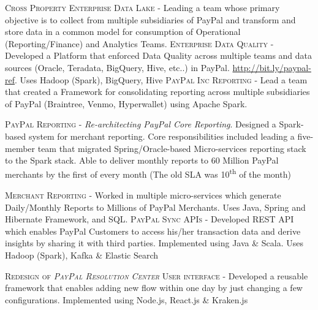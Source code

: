 \documentclass[11pt, a4paper, sans]{moderncv}
\begin{document}
{\textsc{Cross Property Enterprise Data Lake} - Leading a team whose primary objective is to collect from multiple subsidiaries of PayPal and transform and store data in a common model for consumption of Operational (Reporting/Finance) and Analytics Teams. \newline
\newline \textsc{Enterprise Data Quality} - Developed a Platform that enforced Data Quality across multiple teams and data sources (Oracle, Teradata, BigQuery, Hive, etc..) in PayPal. \url{http://bit.ly/paypal-ref}. Uses Hadoop (Spark), BigQuery, Hive \newline
\newline \textsc{PayPal Inc Reporting} - Lead a team that created a Framework for consolidating reporting across multiple subsidiaries of PayPal (Braintree, Venmo, Hyperwallet) using Apache Spark. \newline} 

{\textsc{PayPal Reporting} - \textit{Re-architecting PayPal Core Reporting}.  Designed a Spark-based system for merchant reporting. Core responsibilities included leading a five-member team that migrated Spring/Oracle-based Micro-services reporting stack to the Spark stack. 
Able to deliver monthly reports to 60 Million PayPal merchants by the first of every month (The old SLA was 10\textsuperscript{th} of the month)  \newline} 

{\textsc{Merchant Reporting} - Worked in multiple micro-services which generate Daily/Monthly Reports to Millions of PayPal Merchants. Uses Java, Spring and Hibernate Framework, and SQL. \newline 
\newline \textsc{PayPal Sync APIs} - Developed REST API which enables PayPal Customers to access his/her transaction data and derive insights by sharing it with third parties. Implemented using Java \& Scala. Uses Hadoop (Spark), Kafka \& Elastic Search \newline} 

{\textsc{Redesign of \textit{PayPal Resolution Center} User interface} - Developed a reusable framework that enables adding new flow within one day by just changing a few configurations. Implemented using Node.js, React.js \& Kraken.js \newline} 
\end{document}
